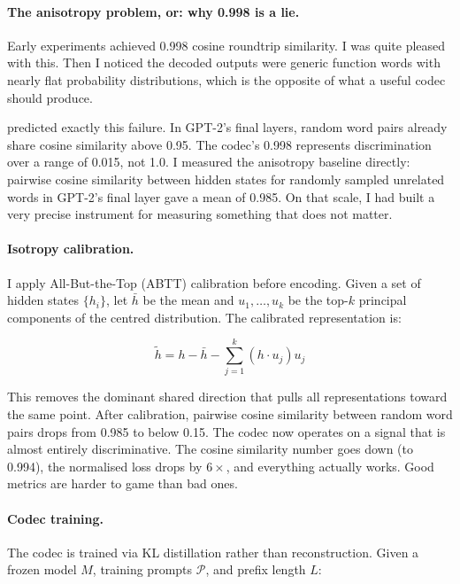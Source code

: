 \documentclass[10pt,twocolumn]{article}
\begin{document}
\paragraph{The anisotropy problem, or: why 0.998 is a lie.}
Early experiments achieved 0.998 cosine roundtrip similarity. I was quite pleased with this. Then I noticed the decoded outputs were generic function words with nearly flat probability distributions, which is the opposite of what a useful codec should produce.

\citet{ethayarajh2019contextual} predicted exactly this failure. In GPT-2's final layers, random word pairs already share cosine similarity above 0.95. The codec's 0.998 represents discrimination over a range of 0.015, not 1.0. I measured the anisotropy baseline directly: pairwise cosine similarity between hidden states for randomly sampled unrelated words in GPT-2's final layer gave a mean of 0.985. On that scale, I had built a very precise instrument for measuring something that does not matter.

\paragraph{Isotropy calibration.}
I apply All-But-the-Top (ABTT) calibration \citep{mu2018allbuttop} before encoding. Given a set of hidden states $\{h_i\}$, let $\bar{h}$ be the mean and $u_1, \ldots, u_k$ be the top-$k$ principal components of the centred distribution. The calibrated representation is:

\begin{equation}
    \tilde{h} = h - \bar{h} - \sum_{j=1}^{k} (h \cdot u_j) u_j
    \label{eq:isocal}
\end{equation}

This removes the dominant shared direction that pulls all representations toward the same point. After calibration, pairwise cosine similarity between random word pairs drops from 0.985 to below 0.15. The codec now operates on a signal that is almost entirely discriminative. The cosine similarity number goes down (to 0.994), the normalised loss drops by $6\times$, and everything actually works. Good metrics are harder to game than bad ones.

\paragraph{Codec training.}
The codec is trained via KL distillation rather than reconstruction. Given a frozen model $M$, training prompts $\mathcal{P}$, and prefix length $L$:
\end{document}
